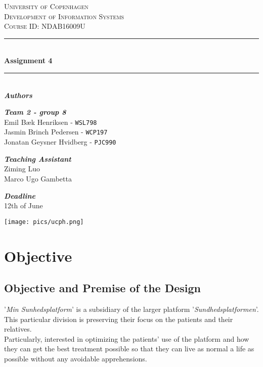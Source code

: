 \documentclass[a4paper,11pt]{article}
\begin{document}
\begin{titlepage}
    \newcommand{\HRule}{\rule{\linewidth}{0.5mm}}
    \center
    \textsc{\LARGE University of Copenhagen}\\[1.5cm]
    \textsc{\Large Development of Information Systems}\\[0.5cm]
    \textsc{Course ID: NDAB16009U}

    \vfill
    \HRule\\[0.4cm]
    {\huge\bfseries Assignment 4}\\[0.4cm]
    \HRule\\[1.5cm]

    \large\textit{\textbf{Authors}}
    
    \large\textit{\textbf{Team 2 -  group 8}}
    \\Emil Bæk Henriksen - \texttt{WSL798}
    \\Jasmin Brinch Pedersen - \texttt{WCP197}
    \\Jonatan Geysner Hvidberg - \texttt{PJC990}
    
    \vfill

    \large\textit{\textbf{Teaching Assistant}}
    \\Ziming Luo
    \\Marco Ugo Gambetta

    \vfill
    \large\textit{\textbf{Deadline}}
    \\12th of June
    \vfill

\texttt{[image: pics/ucph.png]}
\end{titlepage}


\newpage
\tableofcontents
\newpage

\section{Objective}
\subsection{Objective and Premise of the Design}
'\textit{Min Sunhedsplatform}' is a subsidiary of the larger platform '\textit{Sundhedsplatformen}'. This particular division is preserving their focus on the patients and their relatives.\\ Particularly, interested in optimizing the patients' use of the platform and how they can get the best treatment possible so that they can live as normal a life as possible without any avoidable apprehensions.\\
\end{document}
